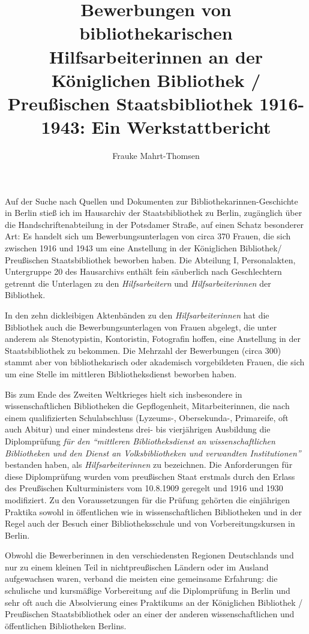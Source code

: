 \documentclass[a4paper,
fontsize=11pt,
oneside,
numbers=noperiodatend,
parskip=half-,
bibliography=totoc,
final
]{scrartcl}
\title{\LARGE{Bewerbungen von bibliothekarischen Hilfsarbeiterinnen an der Königlichen Bibliothek / Preußischen Staatsbibliothek 1916-1943}: Ein Werkstattbericht} %
\author{Frauke Mahrt-Thomsen} %
\date{}
\begin{document}
\maketitle
\thispagestyle{fancyplain} 


Auf der Suche nach Quellen und Dokumenten zur
Bibliothekarinnen-Geschichte in Berlin stieß ich im Hausarchiv der
Staatsbibliothek zu Berlin, zugänglich über die Handschriftenabteilung
in der Potsdamer Straße, auf einen Schatz besonderer Art: Es handelt
sich um Bewerbungsunterlagen von circa 370 Frauen, die sich zwischen
1916 und 1943 um eine Anstellung in der Königlichen Bibliothek/
Preußischen Staatsbibliothek beworben haben. Die Abteilung I,
Personalakten, Untergruppe 20 des Hausarchivs enthält fein säuberlich
nach Geschlechtern getrennt die Unterlagen zu den \emph{Hilfsarbeitern}
und \emph{Hilfsarbeiterinnen} der Bibliothek.

In den zehn dickleibigen Aktenbänden zu den \emph{Hilfsarbeiterinnen}
hat die Bibliothek auch die Bewerbungsunterlagen von Frauen abgelegt,
die unter anderem als Stenotypistin, Kontoristin, Fotografin hoffen,
eine Anstellung in der Staatsbibliothek zu bekommen. Die Mehrzahl der
Bewerbungen (circa 300) stammt aber von bibliothekarisch oder akademisch
vorgebildeten Frauen, die sich um eine Stelle im mittleren
Bibliotheksdienst beworben haben.

Bis zum Ende des Zweiten Weltkrieges hielt sich insbesondere in
wissenschaftlichen Bibliotheken die Gepflogenheit, Mitarbeiterinnen, die
nach einem qualifizierten Schulabschluss (Lyze\-ums-, Obersekunda-,
Primareife, oft auch Abitur) und einer mindestens drei- bis vierjährigen
Ausbildung die Diplomprüfung \emph{für den \enquote{mittleren
Bibliotheksdienst an wissenschaftlichen Bibliotheken und den Dienst an
Volksbibliotheken und verwandten Institutionen}} bestanden haben, als
\emph{Hilfsarbeiterinnen} zu bezeichnen. Die Anforderungen für diese
Diplomprüfung wurden vom preußischen Staat erstmals durch den Erlass des
Preußischen Kulturministers vom 10.8.1909 geregelt und 1916 und 1930
modifiziert. Zu den Voraussetzungen für die Prüfung gehörten die
einjährigen Praktika sowohl in öffentlichen wie in wissenschaftlichen
Bibliotheken und in der Regel auch der Besuch einer Bibliotheksschule
und von Vorbereitungskursen in Berlin.

Obwohl die Bewerberinnen in den verschiedensten Regionen Deutschlands
und nur zu einem kleinen Teil in nichtpreußischen Ländern oder im
Ausland aufgewachsen waren, verband die meisten eine gemeinsame
Erfahrung: die schulische und kursmäßige Vorbereitung auf die
Diplomprüfung in Berlin und sehr oft auch die Absolvierung eines
Praktikums an der Königlichen Bibliothek / Preußischen Staatsbibliothek
oder an einer der anderen wissenschaftlichen und öffentlichen
Bibliotheken Berlins.
\end{document}
